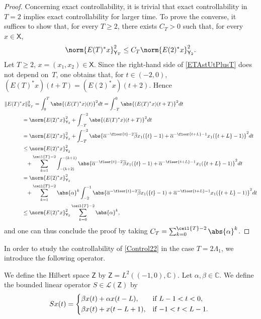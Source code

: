 \begin{proof}
Concerning exact controllability, it is trivial that exact controllability in $T = 2$ implies exact controllability for larger time. To prove the converse, it suffices to show that, for every $T \geq 2$, there exists $C_T > 0$ such that, for every $x \in \mathsf X$,
\[
\norm{E(T)^\ast x}_{\mathsf Y_T}^2 \leq C_T \norm{E(2)^\ast x}_{\mathsf Y_2}^2.
\]
Let $T \geq 2$, $x = (x_1, x_2) \in \mathsf X$. Since the right-hand side of \eqref{ETAstUtPlusT} does not depend on~$T$, one obtains that, for $t \in (-2, 0)$, $(E(T)^\ast x)(t + T) = (E(2)^\ast x)(t + 2)$. Hence
\begin{align*}
\Vert E(T)^\ast& x\Vert_{\mathsf Y_T}^2  = \int_0^T \abs{(E(T)^\ast x)(t)}^2 dt = \int_{-T}^0 \abs{(E(T)^\ast x)(t + T)}^2 dt  \\
& = \norm{E(2)^\ast x}_{\mathsf Y_2}^2 + \int_{-T}^{-2} \abs{(E(T)^\ast x)(t + T)}^2 dt  \\
& = \norm{E(2)^\ast x}_{\mathsf Y_2}^2 + \int_{-T}^{-2} \abs{\overline\alpha^{-\floor{t} - 2} \overline\beta x_1(\{t\} - 1) + \overline\alpha^{-\floor{t + L} - 1} x_1(\{t + L\} - 1)}^2 dt  \\
& \leq \norm{E(2)^\ast x}_{\mathsf Y_2}^2 \\
& \hphantom{\leq} {} + \sum_{k=1}^{\ceil{T} - 2} \int_{-(k+2)}^{-(k+1)} \abs{\overline\alpha^{-\floor{t} - 2} \overline\beta x_1(\{t\} - 1) + \overline\alpha^{-\floor{t + L} - 1} x_1(\{t + L\} - 1)}^2 dt  \\
& = \norm{E(2)^\ast x}_{\mathsf Y_2}^2 \\
& \hphantom{=} {} + \sum_{k=1}^{\ceil{T} - 2} \abs{\alpha}^k \int_{-2}^{-1} \abs{\overline\alpha^{-\floor{t} - 2} \overline\beta x_1(\{t\} - 1) + \overline\alpha^{-\floor{t + L} - 1} x_1(\{t + L\} - 1)}^2 dt  \\
& \leq \norm{E(2)^\ast x}_{\mathsf Y_2}^2 \sum_{k=0}^{\ceil{T} - 2} \abs{\alpha}^k,
\end{align*}
and one can thus conclude the proof by taking $C_T = \sum_{k=0}^{\ceil{T} - 2} \abs{\alpha}^k$.
\end{proof}

In order to study the controllability of \eqref{Control22} in the case $T = 2 \Lambda_1$, we introduce the following operator.

\begin{defi}
\label{DefinitionS}
We define the Hilbert space $\mathsf Z$ by $\mathsf Z = L^2((-1, 0), \mathbb C)$. Let $\alpha, \beta \in \mathbb C$. We define the bounded linear operator $S \in \mathcal L(\mathsf Z)$ by
\begin{equation}
\label{DefS}
S x(t) =
\begin{dcases*}
\beta x(t) + \alpha x(t - L), & if $L - 1 < t < 0$, \\
\beta x(t) + x(t - L + 1), & if $-1 < t < L - 1$.
\end{dcases*}
\end{equation}
\end{defi}

